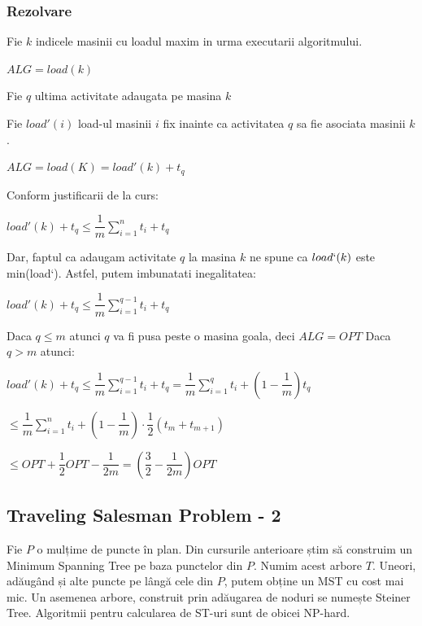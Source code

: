 \documentclass[a4paper]{article}
\begin{document}
\subsubsection*{Rezolvare}
\begin{flushleft}
Fie $k$ indicele masinii cu loadul maxim in urma executarii algoritmului.

$ALG = load(k)$

Fie $q$ ultima activitate adaugata pe masina $k$

Fie $load'(i)$ load-ul masinii $i$ fix inainte ca activitatea $q$ sa fie asociata masinii $k$.

$ALG = load(K) = load'(k) + t_{q}$

Conform justificarii de la curs:
\begin{center}
$load'(k) + t_{q} \leq \dfrac{1}{m} \sum_{i=1}^{n}t_{i} + t_{q}$
\end{center}

Dar, faptul ca adaugam activitate $q$ la masina $k$ ne spune ca $load`(k)$ este min(load`). Astfel, putem imbunatati inegalitatea:

\begin{center}
$load'(k) + t_{q} \leq \dfrac{1}{m} \sum_{i=1}^{q-1}t_{i} + t_{q}$
\end{center} 

Daca $q \leq m$ atunci $q$ va fi pusa peste o masina goala, deci $ALG = OPT$
Daca $q > m$ atunci:
\begin{center}
$load'(k) + t_{q} \leq \dfrac{1}{m} \sum_{i=1}^{q-1}t_{i} + t_{q} = \dfrac{1}{m} \sum_{i=1}^{q}t_{i} + (1-\dfrac{1}{m})t_{q}$ 

$ \leq \dfrac{1}{m} \sum_{i=1}^{n}t_{i} + (1-\dfrac{1}{m}) \cdot \dfrac{1}{2}(t_{m} + t_{m+1})$

$ \leq OPT + \dfrac{1}{2} OPT  - \dfrac{1}{2m}= (\dfrac{3}{2} - \dfrac{1}{2m})OPT$
\end{center}

\end{flushleft}

\subsection{Traveling Salesman Problem - 2}
Fie $P$ o mulțime de puncte în plan. Din cursurile anterioare știm să
construim un Minimum Spanning Tree pe baza punctelor din $P$. Numim acest arbore $T$. Uneori, adăugând și alte puncte pe lângă cele din
$P$, putem obține un MST cu cost mai mic. Un asemenea arbore, construit prin adăugarea de noduri se numește Steiner Tree. Algoritmii
pentru calcularea de ST-uri sunt de obicei NP-hard.
\end{document}
